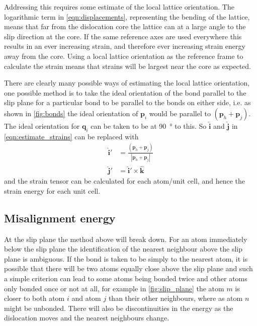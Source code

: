 Addressing this requires some estimate of the local lattice orientation. The logarithmic term in \autoref{eqn:displacements}, representing the bending of the lattice, means that far from the dislocation core the lattice can at a large angle to the slip direction at the core. If the same reference axes are used everywhere this results in an ever increasing strain, and therefore ever increasing strain energy away from the core. Using a local lattice orientation as the reference frame to calculate the strain means that strains will be largest near the core as expected.


There are clearly many possible ways of estimating the local lattice orientation, one possible method is to take the ideal orientation of the bond parallel to the slip plane for a particular bond to be parallel to the bonds on either side, i.e. as shown in \autoref{fig:bonds} the ideal orientation of $\mathbf{p}_i$ would be  parallel to $(\mathbf{p}_h + \mathbf{p}_j)$. The ideal orientation for $\mathbf{q}_i$ can be taken to be at \SI{90}{\degree} to this. So $\mathbf{\hat{i}}$ and $\mathbf{\hat{j}}$ in \autoref{eqn:estimate_strains} can be replaced with 
\begin{align}
\mathbf{\hat{i}}' &= \frac{(\mathbf{p}_h + \mathbf{p}_j)}{|\mathbf{p}_h + \mathbf{p}_j|} \nonumber \\
\mathbf{\hat{j}}' &= {\mathbf{\hat{i}}' \times \mathbf{\hat{k}}}
\end{align}
and the strain tensor can be calculated for each atom/unit cell, and hence the strain energy for each unit cell.



\FloatBarrier
\subsection{Misalignment energy}
\FloatBarrier

At the slip plane the method above will break down. For an atom immediately below the slip plane the identification of the nearest neighbour above the slip plane is ambiguous. If the bond is taken to be simply to the nearest atom, it is possible that there will be two atoms equally close above the slip plane and such a simple criterion can lead to some atoms being bonded twice and other atoms only bonded once or not at all, for example in \autoref{fig:slip_plane} the atom $m$ is closer to both atom $i$ and atom $j$ than their other neighbours, where as atom $n$ might be unbonded. There will also be discontinuities in the energy as the dislocation moves and the nearest neighbours change.

